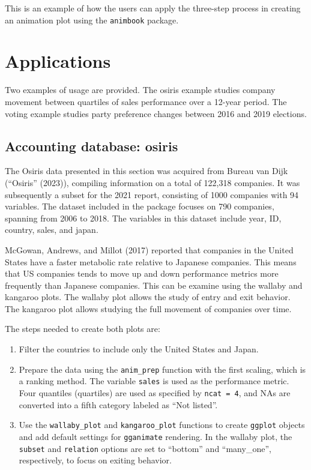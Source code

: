 This is an example of how the users can apply the three-step process in creating an animation plot using the \texttt{animbook} package.

\hypertarget{applications}{%
\section{Applications}\label{applications}}

Two examples of usage are provided. The osiris example studies company movement between quartiles of sales performance over a 12-year period. The voting example studies party preference changes between 2016 and 2019 elections.

\hypertarget{accounting-database-osiris}{%
\subsection{Accounting database: osiris}\label{accounting-database-osiris}}

The Osiris data presented in this section was acquired from Bureau van Dijk ({``Osiris''} (2023)), compiling information on a total of 122,318 companies. It was subsequently a subset for the 2021 report, consisting of 1000 companies with 94 variables. The dataset included in the package focuses on 790 companies, spanning from 2006 to 2018. The variables in this dataset include year, ID, country, sales, and japan.

McGowan, Andrews, and Millot (2017) reported that companies in the United States have a faster metabolic rate relative to Japanese companies. This means that US companies tends to move up and down performance metrics more frequently than Japanese companies. This can be examine using the wallaby and kangaroo plots. The wallaby plot allows the study of entry and exit behavior. The kangaroo plot allows studying the full movement of companies over time.

The steps needed to create both plots are:

\begin{enumerate}
\def\labelenumi{\arabic{enumi}.}
\tightlist
\item
  Filter the countries to include only the United States and Japan.
\item
  Prepare the data using the \texttt{anim\_prep} function with the first scaling, which is a ranking method. The variable \texttt{sales} is used as the performance metric. Four quantiles (quartiles) are used as specified by \texttt{ncat\ =\ 4}, and NAs are converted into a fifth category labeled as ``Not listed''.
\item
  Use the \texttt{wallaby\_plot} and \texttt{kangaroo\_plot} functions to create \texttt{ggplot} objects and add default settings for \texttt{gganimate} rendering. In the wallaby plot, the \texttt{subset} and \texttt{relation} options are set to ``bottom'' and ``many\_one'', respectively, to focus on exiting behavior.
\end{enumerate}

